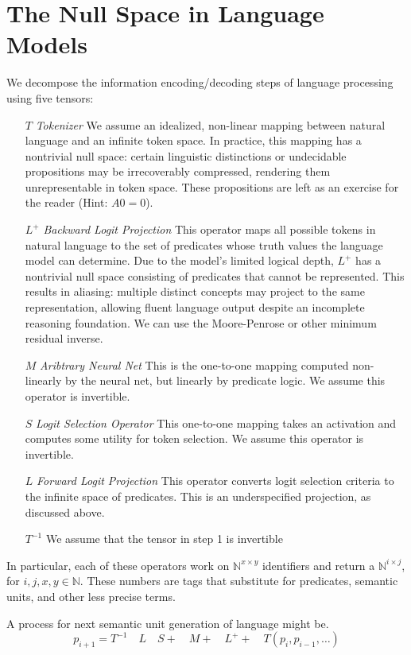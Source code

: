 \documentclass[12pt]{article}
\theoremstyle{plain}
\begin{document}
\section{The Null Space in Language Models}
We decompose the information encoding/decoding steps of language processing
using five tensors:
\begin{enumerate}
\item[$T$] \emph{Tokenizer} We assume an idealized, non-linear mapping 
 between natural language and an infinite token space. In practice, this 
 mapping has a nontrivial null space: certain linguistic distinctions or 
undecidable propositions may be irrecoverably compressed, rendering them 
unrepresentable in token space.  These propositions are left as an
        exercise for the reader (Hint: $A0 = 0$).
    \item[$L^+$] \emph{Backward Logit Projection} This operator maps all 
        possible tokens in natural language to the set of 
predicates whose truth values the language model can determine. Due to the model’s 
limited logical depth, $L^+$ has a nontrivial null space consisting of predicates 
that cannot be represented. This results in aliasing: multiple distinct concepts may 
project to the same representation, allowing fluent language output despite an 
incomplete reasoning foundation. We can use the Moore-Penrose or other minimum residual inverse.
    \item[$M$] \emph{Aribtrary Neural Net} This is the one-to-one mapping computed non-linearly by the neural net, 
    but linearly by predicate logic.  We assume this operator is invertible.
\item[$S$] \emph{Logit Selection Operator} This one-to-one mapping takes an activation and computes some utility for 
    token selection.  We assume this operator is invertible.
\item[$L$] \emph{Forward Logit Projection}  This operator converts logit selection criteria to the
    infinite space of predicates. This is an underspecified projection, as discussed above.
\item[$T^{-1}$] We assume that the tensor in step 1 is invertible
\end{enumerate}
In particular, each of these operators work on $\mathbb{N}^{x\times y}$ identifiers
and return a $\mathbb{N}^{i\times j}$, for $i,j,x,y\in\mathbb{N}$.  These numbers are tags 
that substitute for predicates, semantic units, and other less precise terms.

A process for next semantic unit generation of language might be.
$$
p_{i+1} = T^{-1}\quad L \quad S + \quad M + \quad L^+ + \quad T (p_i,p_{i-1},\ldots)
$$
\end{document}
